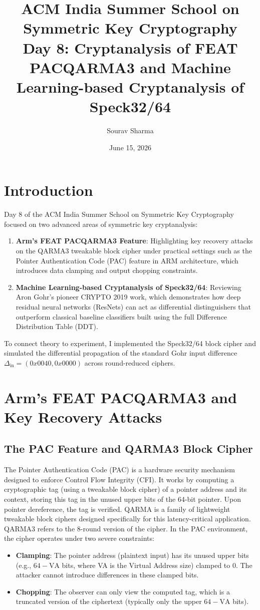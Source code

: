 \documentclass{article}
\title{ACM India Summer School on Symmetric Key Cryptography \\ Day 8: Cryptanalysis of FEAT PACQARMA3 and Machine Learning-based Cryptanalysis of Speck32/64}
\author{Sourav Sharma}
\date{June 15, 2026}
\begin{document}
\maketitle

\section{Introduction}
Day 8 of the ACM India Summer School on Symmetric Key Cryptography focused on two advanced areas of symmetric key cryptanalysis:
\begin{enumerate}
    \item \textbf{Arm's FEAT PACQARMA3 Feature}: Highlighting key recovery attacks on the QARMA3 tweakable block cipher under practical settings such as the Pointer Authentication Code (PAC) feature in ARM architecture, which introduces data clamping and output chopping constraints.
    \item \textbf{Machine Learning-based Cryptanalysis of Speck32/64}: Reviewing Aron Gohr's pioneer CRYPTO 2019 work, which demonstrates how deep residual neural networks (ResNets) can act as differential distinguishers that outperform classical baseline classifiers built using the full Difference Distribution Table (DDT).
\end{enumerate}

To connect theory to experiment, I implemented the Speck32/64 block cipher and simulated the differential propagation of the standard Gohr input difference $\Delta_{\text{in}} = (0x0040, 0x0000)$ across round-reduced ciphers.

\section{Arm's FEAT PACQARMA3 and Key Recovery Attacks}

\subsection{The PAC Feature and QARMA3 Block Cipher}
The Pointer Authentication Code (PAC) is a hardware security mechanism designed to enforce Control Flow Integrity (CFI). It works by computing a cryptographic tag (using a tweakable block cipher) of a pointer address and its context, storing this tag in the unused upper bits of the 64-bit pointer. Upon pointer dereference, the tag is verified.
QARMA is a family of lightweight tweakable block ciphers designed specifically for this latency-critical application. QARMA3 refers to the 8-round version of the cipher. In the PAC environment, the cipher operates under two severe constraints:
\begin{itemize}
    \item \textbf{Clamping}: The pointer address (plaintext input) has its unused upper bits (e.g., $64 - \text{VA}$ bits, where VA is the Virtual Address size) clamped to 0. The attacker cannot introduce differences in these clamped bits.
    \item \textbf{Chopping}: The observer can only view the computed tag, which is a truncated version of the ciphertext (typically only the upper $64 - \text{VA}$ bits).
\end{itemize}
\end{document}
